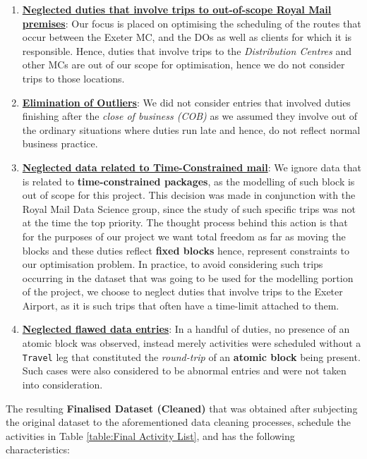 \begin{enumerate}[label=\textbf{\arabic*}.]
\item \underline{\textbf{Neglected duties that involve trips to out-of-scope Royal Mail premises}}: Our focus is placed on optimising the scheduling of the routes that occur between the Exeter MC, and the DOs as well as clients for which it is responsible. Hence, duties that involve trips to the \textit{Distribution Centres} and other MCs are out of our scope for optimisation, hence we do not consider trips to those locations.\par


\item \underline{\textbf{Elimination of Outliers}}: We did not consider entries that involved duties finishing after the \textit{close of business (COB)} as we assumed they involve out of the ordinary situations where duties run late and hence, do not reflect normal business practice.\par


\item \underline{\textbf{Neglected data related to Time-Constrained mail}}: We ignore data that is related to \textbf{time-constrained packages}, as the modelling of such block is out of scope for this project. This decision was made in conjunction with the Royal Mail Data Science group, since the study of such specific trips was not at the time the top priority. The thought process behind this action is that for the purposes of our project we want total freedom as far as moving the blocks and these duties reflect \textbf{fixed blocks} hence, represent constraints to our optimisation problem. In practice, to avoid considering such trips occurring in the dataset that was going to be used for the modelling portion of the project, we choose to neglect duties that involve trips to the Exeter Airport, as it is such trips that often have a time-limit attached to them. \par


\item \underline{\textbf{Neglected flawed data entries}}: In a handful of duties, no presence of an atomic block was observed, instead merely activities were scheduled without a \texttt{Travel} leg that constituted the \textit{round-trip} of an \textbf{atomic block} being present. Such cases were also considered to be abnormal entries and were not taken into consideration. \par

\end{enumerate}

\vspace{\baselineskip}
\noindent
The resulting \textbf{Finalised Dataset (Cleaned)} that was obtained after subjecting the original dataset to the aforementioned data cleaning processes, schedule the activities in Table \ref{table:Final Activity List}, and has the following characteristics: 

